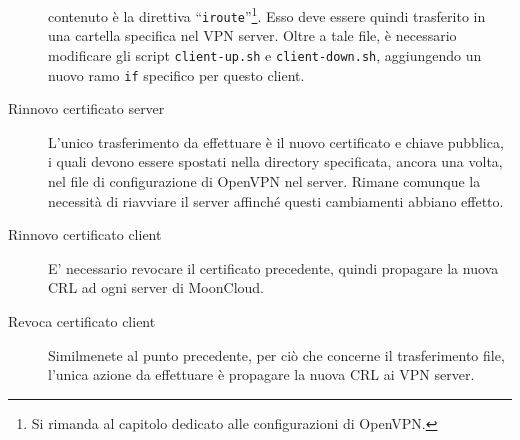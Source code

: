 \begin{description}
	contenuto è la direttiva ``\texttt{iroute}''\footnote{Si rimanda al capitolo dedicato
	alle configurazioni di OpenVPN.}. Esso deve essere quindi trasferito in una cartella
	specifica nel VPN server. Oltre a tale file, è necessario modificare gli script
	\texttt{client-up.sh} e \texttt{client-down.sh}, aggiungendo un nuovo ramo
	\texttt{if} specifico per questo client.
	\item[Rinnovo certificato server]L'unico trasferimento da effettuare è il nuovo
	certificato e chiave pubblica, i quali devono essere spostati nella directory
	specificata, ancora una volta, nel file di configurazione di OpenVPN nel server.
	Rimane comunque la necessità di riavviare il server affinché questi cambiamenti abbiano
	effetto.
	\item[Rinnovo certificato client]E' necessario revocare il certificato precedente,
	quindi propagare la nuova CRL ad ogni server di MoonCloud.
	\item[Revoca certificato client]Similmenete al punto precedente, per ciò che concerne
	il trasferimento file, l'unica azione da effettuare è propagare la nuova
	CRL ai VPN server.
\end{description}

